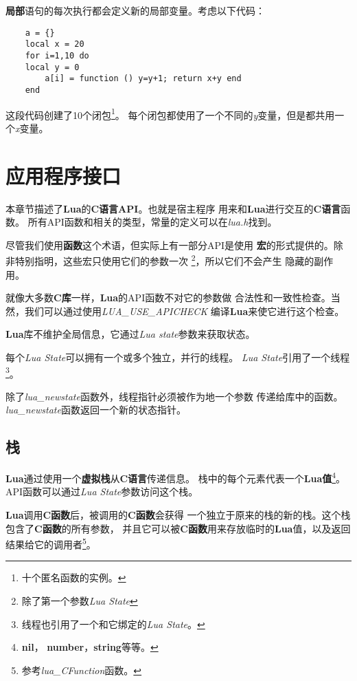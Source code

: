 \documentclass{ctexart}
\begin{document}
\textbf{局部}语句的每次执行都会定义新的局部变量。考虑以下代码：

\lstset{language=C}
\begin{lstlisting}
	a = {}
	local x = 20
	for i=1,10 do
	local y = 0
		a[i] = function () y=y+1; return x+y end
	end
\end{lstlisting}

这段代码创建了10个闭包\footnote{十个匿名函数的实例。}。
每个闭包都使用了一个不同的\emph{y}变量，但是都共用一个\emph{x}变量。

\section{应用程序接口}

本章节描述了\textbf{Lua}的\textbf{C语言API}。也就是宿主程序
用来和\textbf{Lua}进行交互的\textbf{C语言}函数。
所有API函数和相关的类型，常量的定义可以在\emph{lua.h}找到。

尽管我们使用\textbf{函数}这个术语，但实际上有一部分API是使用
\textbf{宏}的形式提供的。除非特别指明，这些宏只使用它们的参数一次
\footnote{除了第一个参数\emph{Lua State}}，所以它们不会产生
隐藏的副作用。

就像大多数\textbf{C库}一样，\textbf{Lua}的API函数不对它的参数做
合法性和一致性检查。当然，我们可以通过使用\emph{LUA\_USE\_APICHECK}
编译\textbf{Lua}来使它进行这个检查。

\textbf{Lua}库不维护全局信息，它通过\emph{Lua state}参数来获取状态。

每个\emph{Lua State}可以拥有一个或多个独立，并行的线程。
\emph{Lua State}引用了一个线程
\footnote{线程也引用了一个和它绑定的\emph{Lua State}。}。

除了\emph{lua\_newstate}函数外，线程指针必须被作为地一个参数
传递给库中的函数。\emph{lua\_newstate}函数返回一个新的状态指针。

\subsection{栈}

\textbf{Lua}通过使用一个\textbf{虚拟栈}从\textbf{C语言}传递信息。
栈中的每个元素代表一个\textbf{Lua值}\footnote{\textbf{nil}，
\textbf{number}，\textbf{string}等等。}。
API函数可以通过\emph{Lua State}参数访问这个栈。

\textbf{Lua}调用\textbf{C函数}后，被调用的\textbf{C函数}会获得
一个独立于原来的栈的新的栈。这个栈包含了\textbf{C函数}的所有参数，
并且它可以被\textbf{C函数}用来存放临时的\textbf{Lua}值，以及返回
结果给它的调用者\footnote{参考\emph{lua\_CFunction}函数。}。
\end{document}

